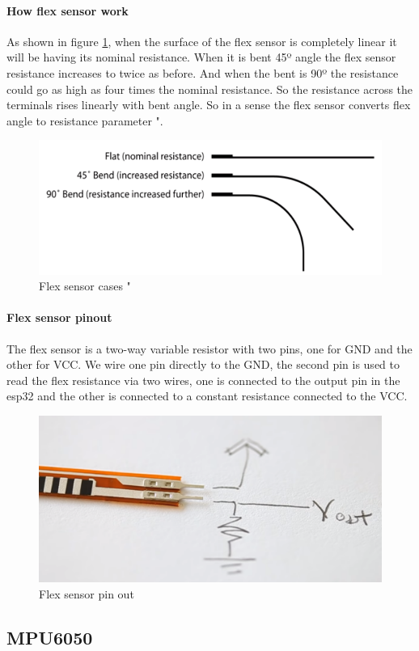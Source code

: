 \paragraph{How flex sensor work}
As shown in figure \ref{fig:flex-cases}, when the surface of the flex sensor is completely linear it will be having its nominal resistance. When it is bent 45º angle the flex sensor resistance increases to twice as before. And when the bent is 90º the resistance could go as high as four times the nominal resistance. So the resistance across the terminals rises linearly with bent angle. So in a sense the flex sensor converts flex angle to resistance parameter "\cite{flex}.
\begin{figure}[h]
	\centering
	\includegraphics[width=0.6\linewidth]{images/flex-cases}
	\caption{Flex sensor cases "\cite{flex}}
	\label{fig:flex-cases}
\end{figure}
\paragraph{Flex sensor pinout}
The flex sensor is a two-way variable resistor with two pins, one for GND and the other for VCC. We wire one pin directly to the GND, the second pin is used to read the flex resistance via two wires, one is connected to the output pin in the esp32 and the other is connected to a constant resistance connected to the VCC.
\begin{figure}[h]
	\centering
	\includegraphics[width=0.6\linewidth]{images/flex-pinout}
	\caption{Flex sensor pin out}
	\label{fig:flex-pinout}
\end{figure}
\subsection{MPU6050}
